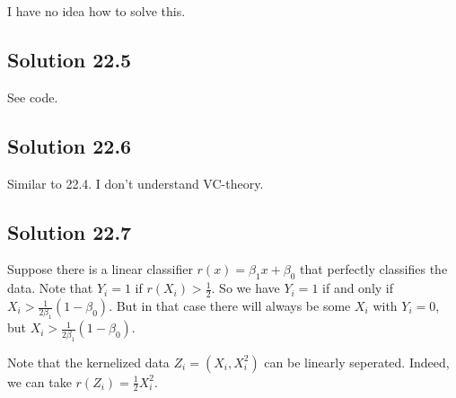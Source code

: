 I have no idea how to solve this.


\subsection*{Solution 22.5}

See code.


\subsection*{Solution 22.6}

Similar to 22.4. I don't understand VC-theory.


\subsection*{Solution 22.7}

Suppose there is a linear classifier $r(x) = \beta_1 x + \beta_0$ that perfectly classifies the data.
Note that $Y_i = 1$ if $r(X_i) > \frac{1}{2}$.
So we have $Y_i = 1$ if and only if $X_i > \frac{1}{2 \beta_1} (1 - \beta_0)$.
But in that case there will always be some $X_i$ with $Y_i = 0$, but $X_i > \frac{1}{2 \beta_1} (1 - \beta_0)$.

Note that the kernelized data $Z_i = (X_i, X_i^2)$ can be linearly seperated.
Indeed, we can take $r(Z_i) = \frac{1}{2} X_i^2$.
